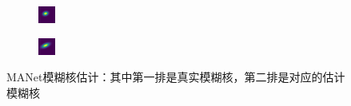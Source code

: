 \begin{figure}[htbp]
\begin{subfigure}{0.24\textwidth}
    \end{subfigure}
    \hfill
    \begin{subfigure}{0.24\textwidth}
        \includegraphics[width=\linewidth]{imgs/kernels/manet_ker_3_fake.png}
    \end{subfigure}
    \hfill
    \begin{subfigure}{0.24\textwidth}
        \includegraphics[width=\linewidth]{imgs/kernels/manet_ker_5_fake.png}
    \end{subfigure}
    \caption{MANet模糊核估计：其中第一排是真实模糊核，第二排是对应的估计模糊核}
    \label{fig:ker_manet}
\end{figure}

